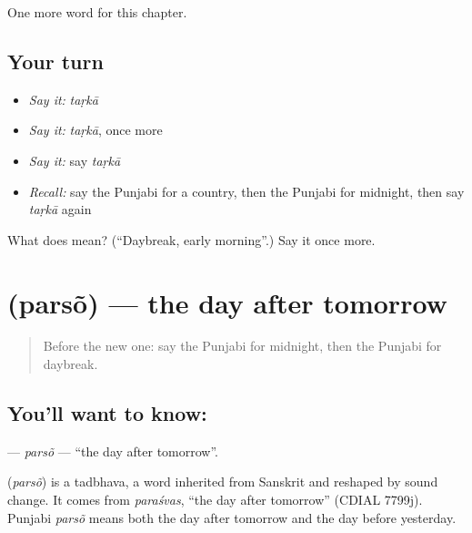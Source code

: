 \begin{grammarlens}[title={What you've built}]
One more word for this chapter.
\end{grammarlens}

\subsection*{Your turn}
\begin{itemize}
\raggedright
  \item \emph{Say it:} \emph{taṛkā}
  \item \emph{Say it:} \emph{taṛkā}, once more
  \item \emph{Say it:} say \emph{taṛkā}
  \item \emph{Recall:} say the Punjabi for a country, then the Punjabi for midnight, then say \emph{taṛkā} again
\end{itemize}

\begin{tcolorbox}[breakable,colback=teal!4,colframe=teal!35!black,title={Before you move on}]
What does  mean? (\textquotedblleft{}Daybreak, early morning\textquotedblright{}.) Say it once more.
\end{tcolorbox}
\section[\texorpdfstring{\pa{ਪਰਸੋਂ} (parsõ)}{ਪਰਸੋਂ (parsõ)}]{ (parsõ) — the day after tomorrow}

\label{lesson:PA-C99-parso}



\begin{quote}
Before the new one: say the Punjabi for midnight, then the Punjabi for daybreak.
\end{quote}

\subsection*{You'll want to know: }
\textbf{} — \emph{parsõ} — \textquotedblleft{}the day after tomorrow\textquotedblright{}.

\begin{cousinweb}
\textbf{} (\emph{parsõ}) is a tadbhava, a word inherited from Sanskrit and reshaped by sound change. It comes from \emph{paraśvas}, \textquotedblleft{}the day after tomorrow\textquotedblright{} (CDIAL 7799j). Punjabi \emph{parsõ} means both the day after tomorrow and the day before yesterday.
\end{cousinweb}

